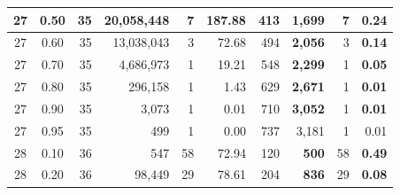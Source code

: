 \begin{table}[H]
\begin{tabular}{|c|c|r|r|r|r|r|r|r|r|}
        27                              & 0.50                               & 35                                              & 20,058,448                                       & 7             & 187.88        & 413           & \textbf{1,699}   & 7             & \textbf{0.24} \\ \hline
        27                              & 0.60                               & 35                                              & 13,038,043                                       & 3             & 72.68         & 494           & \textbf{2,056}   & 3             & \textbf{0.14} \\ \hline
        27                              & 0.70                               & 35                                              & 4,686,973                                        & 1             & 19.21         & 548           & \textbf{2,299}   & 1             & \textbf{0.05} \\ \hline
        27                              & 0.80                               & 35                                              & 296,158                                          & 1             & 1.43          & 629           & \textbf{2,671}   & 1             & \textbf{0.01} \\ \hline
        27                              & 0.90                               & 35                                              & 3,073                                            & 1             & 0.01          & 710           & \textbf{3,052}   & 1             & \textbf{0.01} \\ \hline
        27                              & 0.95                               & 35                                              & 499                                              & 1             & 0.00          & 737           & 3,181            & 1             & 0.01          \\ \hline
        28                              & 0.10                               & 36                                              & 547                                              & 58            & 72.94         & 120           & \textbf{ 500}    & 58            & \textbf{0.49} \\ \hline
        28                              & 0.20                               & 36                                              & 98,449                                           & 29            & 78.61         & 204           & \textbf{ 836}    & 29            & \textbf{0.08} \\ \hline

\end{tabular}
\end{table}

